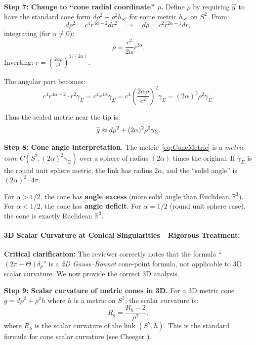 \begin{lemma}
\textbf{Step 7: Change to ``cone radial coordinate'' $\rho$.}
Define $\rho$ by requiring $\widetilde{g}$ to have the standard cone form $d\rho^2 + \rho^2 h_{S^2}$ for some metric $h_{S^2}$ on $S^2$. From:
\begin{equation}
    d\rho^2 = c^4 r^{4\alpha - 2} dr^2 \quad \Rightarrow \quad d\rho = c^2 r^{2\alpha - 1} dr,
\end{equation}
integrating (for $\alpha \neq 0$):
\begin{equation}
    \rho = \frac{c^2}{2\alpha} r^{2\alpha}.
\end{equation}
Inverting: $r = \left(\frac{2\alpha \rho}{c^2}\right)^{1/(2\alpha)}$.

The angular part becomes:
\begin{equation}
    c^4 r^{4\alpha - 2} \cdot r^2 \gamma_\Sigma = c^4 r^{4\alpha} \gamma_\Sigma = c^4 \left(\frac{2\alpha \rho}{c^2}\right)^{2} \gamma_\Sigma = (2\alpha)^2 \rho^2 \gamma_\Sigma.
\end{equation}

Thus the sealed metric near the tip is:
\begin{equation}\label{eq:ConeMetric}
    \widetilde{g} \approx d\rho^2 + (2\alpha)^2 \rho^2 \gamma_\Sigma.
\end{equation}

\textbf{Step 8: Cone angle interpretation.}
The metric~\eqref{eq:ConeMetric} is a \emph{metric cone} $C(S^2, (2\alpha)^2 \gamma_\Sigma)$ over a sphere of radius $(2\alpha)$ times the original. If $\gamma_\Sigma$ is the round unit sphere metric, the link has radius $2\alpha$, and the ``solid angle'' is $(2\alpha)^2 \cdot 4\pi$.

For $\alpha > 1/2$, the cone has \textbf{angle excess} (more solid angle than Euclidean $\mathbb{R}^3$).
For $\alpha < 1/2$, the cone has \textbf{angle deficit}.
For $\alpha = 1/2$ (round unit sphere case), the cone is exactly Euclidean $\mathbb{R}^3$.

\paragraph{3D Scalar Curvature at Conical Singularities---Rigorous Treatment:}
\textbf{Critical clarification:} The reviewer correctly notes that the formula ``$(2\pi - \Theta)\delta_p$'' is a \emph{2D Gauss--Bonnet} cone-point formula, not applicable to 3D scalar curvature. We now provide the correct 3D analysis.

\textbf{Step 9: Scalar curvature of metric cones in 3D.}
For a 3D metric cone $g = d\rho^2 + \rho^2 h$ where $h$ is a metric on $S^2$, the scalar curvature is:
\begin{equation}\label{eq:ConeScalar}
    R_g = \frac{R_h - 2}{\rho^2},
\end{equation}
where $R_h$ is the scalar curvature of the link $(S^2, h)$. This is the standard formula for cone scalar curvature (see Cheeger \cite{cheeger1983}).


\end{lemma}
